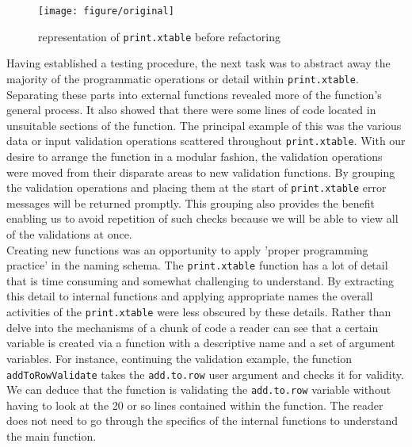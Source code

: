 \documentclass{memoir}\usepackage[]{graphicx}\usepackage[]{color}
\newenvironment{knitrout}{}{} %
\let\code=\texttt
\begin{document}
\begin{figure}[H]
\vspace{-120pt}
\begin{knitrout}
\color{fgcolor}
\texttt{[image: figure/original]} 

\end{knitrout}
\vspace{-110pt}
\caption{representation of \code{print.xtable} before refactoring}\label{fig:original}
\end{figure}


Having established a testing procedure, the next task was to abstract away the majority of the programmatic operations or detail within \code{print.xtable}. Separating these parts into external functions revealed more of the function's general process. It also showed that there were some lines of code located in unsuitable sections of the function. The principal example of this was the various data or input validation operations scattered throughout \code{print.xtable}. With our desire to arrange the function in a modular fashion, the validation operations were moved from their disparate areas to new validation functions. By grouping the validation operations and placing them at the start of \code{print.xtable} error messages will be returned promptly. This grouping also provides the benefit enabling us to avoid repetition of such checks because we will be able to view all of the validations at once.\\


Creating new functions was an opportunity to apply 'proper programming practice' in the naming schema. The \code{print.xtable} function has a lot of detail that is time consuming and somewhat challenging to understand. By extracting this detail to internal functions and applying appropriate names the overall activities of the \code{print.xtable} were less obscured by these details. Rather than delve into the mechanisms of a chunk of code a reader can see that a certain variable is created via a function with a descriptive name and a set of argument variables. For instance, continuing the validation example, the function \code{addToRowValidate} takes the \code{add.to.row} user argument and checks it for validity. We can deduce that the function is validating the \code{add.to.row} variable without having to look at the 20 or so lines contained within the function. The reader does not need to go through the specifics of the internal functions to understand the main function.\\ 
\end{document}
